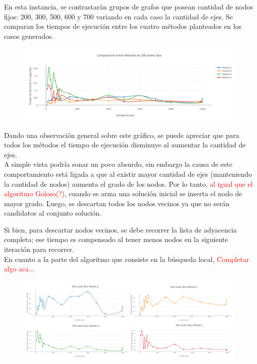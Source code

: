 En esta instancia, se contrastar\'an grupos de grafos que posean cantidad de nodos fijos: 200, 300, 500, 600 y 700 variando en cada caso la cantidad de ejes. Se comparan los tiempos de ejecuci\'on entre los cuatro m\'etodos planteados en los casos generados. 

  \begin{figure}[h!]
   \begin{center}
 	\includegraphics[scale=0.55]{imagenes/local/tiempos/200nodos.png}
   \end{center}
 \end{figure}
 
Dando una observaci\'on general sobre este gr\'afico, se puede apreciar que para todos los m\'etodos el tiempo de ejecuci\'on disminuye al aumentar la cantidad de ejes. \\

A simple vista podr\'ia sonar un poco absurdo, sin embargo la causa de este comportamiento  est\'a ligada a que al existir mayor cantidad de ejes (manteniendo la cantidad de nodos) aumenta el grado de los nodos. Por lo tanto\textcolor{red}{, al igual que el algoritmo Goloso(?), } cuando se arma una soluci\'on inicial se inserta el nodo de mayor grado. Luego, se descartan todos los nodos vecinos ya que no ser\'an candidatos al conjunto soluci\'on.

Si bien, para descartar nodos vecinos, se debe recorrer la lista de adyacencia completa; ese tiempo es compensado al tener menos nodos en la siguiente iteraci\'on para recorrer.\\

En cuanto a la parte del algoritmo que consiste en la b\'usqueda local, \textcolor{red}{Completar algo aca...}

   \begin{figure}[h!]
   \begin{center}
 	\includegraphics[scale=0.08]{imagenes/local/tiempos/200nodos2.png}
   \end{center}
 \end{figure}
 
